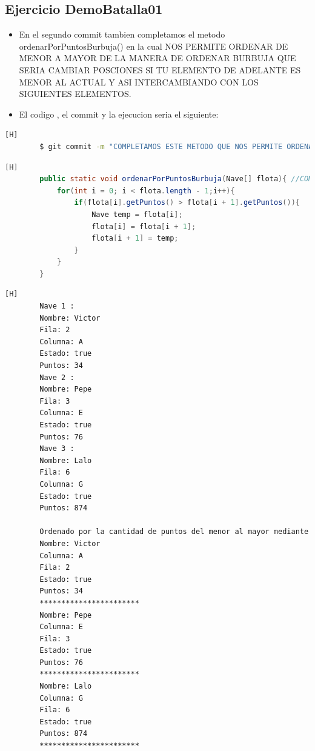 \documentclass{article}
\begin{document}
	\subsection{Ejercicio DemoBatalla01}
	\begin{itemize}	
		\item En el segundo commit tambien completamos el metodo ordenarPorPuntosBurbuja() en la cual NOS PERMITE ORDENAR DE MENOR A MAYOR DE LA MANERA DE ORDENAR BURBUJA QUE SERIA CAMBIAR POSCIONES SI TU ELEMENTO DE ADELANTE ES MENOR AL ACTUAL Y ASI INTERCAMBIANDO CON LOS SIGUIENTES ELEMENTOS.
		\item El codigo , el commit y la ejecucion seria el siguiente:
	\end{itemize}	
	\begin{lstlisting}[language=bash,caption={Commit}][H]
		$ git commit -m "COMPLETAMOS ESTE METODO QUE NOS PERMITE ORDENAR DE MENOR A MAYOR DE LA MANERA DE ORDENAR BURBUJA QUE SERIA CAMBIAR POSCIONES SI TU ELEMENTO DE ADELANTE ES MENOR AL ACTUAL"
	\end{lstlisting}	
	\begin{lstlisting}[language=java,caption={Las lineas de codigo del metodo completado:}][H]
		public static void ordenarPorPuntosBurbuja(Nave[] flota){ //COMPLETAMOS ESTE METODO QUE NOS PERMITE ORDENAR DE MENOR A MAYOR DE LA MANERA DE ORDENAR BURBUJA QUE SERIA CAMBIAR POSCIONES SI TU ELEMENTO DE ADELANTE ES MENOR AL ACTUAL
			for(int i = 0; i < flota.length - 1;i++){
				if(flota[i].getPuntos() > flota[i + 1].getPuntos()){
					Nave temp = flota[i];
					flota[i] = flota[i + 1];
					flota[i + 1] = temp;
				}
			}
		}
	\end{lstlisting}
    \begin{lstlisting}[language=bash,caption={La ejecucion dada:}][H]
		Nave 1 : 
		Nombre: Victor 
		Fila: 2
		Columna: A
		Estado: true
		Puntos: 34
		Nave 2 : 
		Nombre: Pepe
		Fila: 3
		Columna: E
		Estado: true
		Puntos: 76
		Nave 3 : 
		Nombre: Lalo
		Fila: 6
		Columna: G
		Estado: true
		Puntos: 874

		Ordenado por la cantidad de puntos del menor al mayor mediante el metodo burbuja: 
		Nombre: Victor
		Columna: A
		Fila: 2
		Estado: true
		Puntos: 34
		***********************
		Nombre: Pepe
		Columna: E
		Fila: 3
		Estado: true
		Puntos: 76
		***********************
		Nombre: Lalo
		Columna: G
		Fila: 6
		Estado: true
		Puntos: 874
		***********************

    \end{lstlisting}
\end{document}
